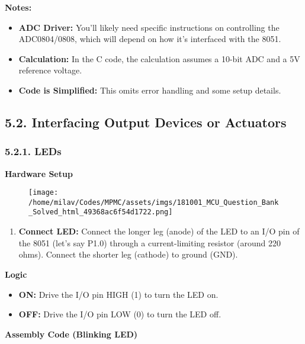 \documentclass[
]{article}
\begin{document}
\textbf{Notes:}

\begin{itemize}
\item
  \textbf{ADC Driver:} You'll likely need specific instructions on
  controlling the ADC0804/0808, which will depend on how it's interfaced
  with the 8051.
\item
  \textbf{Calculation:} In the C code, the calculation assumes a 10-bit
  ADC and a 5V reference voltage.
\item
  \textbf{Code is Simplified:} This omits error handling and some setup
  details.
\end{itemize}

\hypertarget{52-interfacing-output-devices-or-actuators}{%
\subsection{5.2. Interfacing Output Devices or
Actuators}\label{52-interfacing-output-devices-or-actuators}}

\hypertarget{521-leds}{%
\subsubsection{5.2.1. LEDs}\label{521-leds}}

\textbf{Hardware Setup}

\begin{figure}
\centering
\texttt{[image: /home/milav/Codes/MPMC/assets/imgs/181001\_MCU\_Question\_Bank\_Solved\_html\_49368ac6f54d1722.png]}
\caption{}
\end{figure}

\begin{enumerate}
\def\labelenumi{\arabic{enumi}.}
\item
  \textbf{Connect LED:} Connect the longer leg (anode) of the LED to an
  I/O pin of the 8051 (let's say P1.0) through a current-limiting
  resistor (around 220 ohms). Connect the shorter leg (cathode) to
  ground (GND).
\end{enumerate}

\textbf{Logic}

\begin{itemize}
\item
  \textbf{ON:} Drive the I/O pin HIGH (1) to turn the LED on.
\item
  \textbf{OFF:} Drive the I/O pin LOW (0) to turn the LED off.
\end{itemize}

\textbf{Assembly Code (Blinking LED)}
\end{document}
